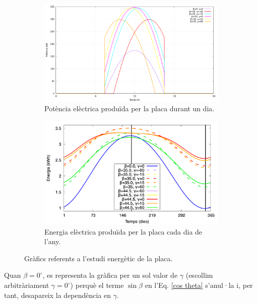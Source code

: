 \documentclass[11pt]{article}
\begin{document}
\begin{figure}[H]
    \centering
    \begin{subfigure}{0.5\textwidth}
        \centering
        \includegraphics[width=\textwidth]{dia1_pot_plot.png}
        \caption{Potència elèctrica produïda per la placa durant un dia.}
        \label{fig: potencia}
    \end{subfigure}%
    \hspace{0.000001\textwidth}%
    \begin{subfigure}{0.5\textwidth}
        \centering
        \includegraphics[width=\textwidth]{energia.png}
        \caption{Energia elèctrica produïda per la placa cada dia de l'any.}
        \label{fig: energia}
    \end{subfigure}
    \caption{Gràfics referents a l'estudi energètic de la placa.}
    \label{estudi energia}
\end{figure}

Quan $\beta=0^{\circ}$, es representa la gràfica per un sol valor de $\gamma$ (escollim arbitràriament $\gamma=0^{\circ}$) perquè el terme $\sin\beta$ en l’Eq. \eqref{cos theta} s’anul·la i, per tant, desapareix la dependència en $\gamma$.
\end{document}
